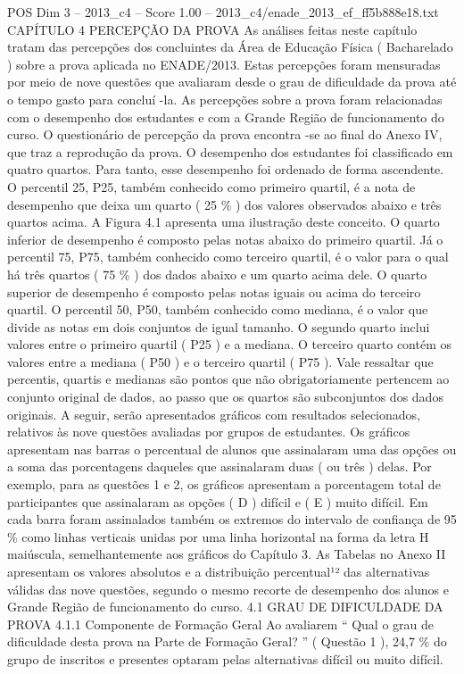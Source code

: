 \begin{textsample}{POS Dim 3 – 2013\_c4 – Score 1.00 – 2013\_c4/enade\_2013\_ef\_ff5b888e18.txt}  \label{ex:f3_pos_163}
CAPÍTULO 4 PERCEPÇÃO DA PROVA As análises feitas neste capítulo tratam das percepções dos concluintes da Área de Educação Física ( Bacharelado ) sobre a prova aplicada no ENADE/2013.
Estas percepções foram mensuradas por meio de nove questões que avaliaram desde o grau de dificuldade da prova até o tempo gasto para concluí -la.
As percepções sobre a prova foram relacionadas com o desempenho dos estudantes e com a Grande Região de funcionamento do curso.
O questionário de percepção da prova encontra -se ao final do Anexo IV, que traz a reprodução da prova.
O desempenho dos estudantes foi classificado em quatro quartos.
Para tanto, esse desempenho foi ordenado de forma ascendente.
O percentil 25, P25, também conhecido como primeiro quartil, é a nota de desempenho que deixa um quarto ( 25 \% ) dos valores observados abaixo e três quartos acima.
A Figura 4.1 apresenta uma ilustração deste conceito.
O quarto inferior de desempenho é composto pelas notas abaixo do primeiro quartil.
Já o percentil 75, P75, também conhecido como terceiro quartil, é o valor para o qual há três quartos ( 75 \% ) dos dados abaixo e um quarto acima dele.
O quarto superior de desempenho é composto pelas notas iguais ou acima do terceiro quartil.
O percentil 50, P50, também conhecido como mediana, é o valor que divide as notas em dois conjuntos de igual tamanho.
O segundo quarto inclui valores entre o primeiro quartil ( P25 ) e a mediana.
O terceiro quarto contém os valores entre a mediana ( P50 ) e o terceiro quartil ( P75 ).
Vale ressaltar que percentis, quartis e medianas são pontos que não obrigatoriamente pertencem ao conjunto original de dados, ao passo que os quartos são subconjuntos dos dados originais.
A seguir, serão apresentados gráficos com resultados selecionados, relativos às nove questões avaliadas por grupos de estudantes.
Os gráficos apresentam nas barras o percentual de alunos que assinalaram uma das opções ou a soma das porcentagens daqueles que assinalaram duas ( ou três ) delas.
Por exemplo, para as questões 1 e 2, os gráficos apresentam a porcentagem total de participantes que assinalaram as opções ( D ) difícil e ( E ) muito difícil.
Em cada barra foram assinalados também os extremos do intervalo de confiança de 95 \% como linhas verticais unidas por uma linha horizontal na forma da letra H maiúscula, semelhantemente aos gráficos do Capítulo 3.
As Tabelas no Anexo II apresentam os valores absolutos e a distribuição percentual¹² das alternativas válidas das nove questões, segundo o mesmo recorte de desempenho dos alunos e Grande Região de funcionamento do curso. 4.1 GRAU DE DIFICULDADE DA PROVA 4.1.1 Componente de Formação Geral Ao avaliarem “ Qual o grau de dificuldade desta prova na Parte de Formação Geral? ” ( Questão 1 ), 24,7 \% do grupo de inscritos e presentes optaram pelas alternativas difícil ou muito difícil.

\end{textsample}
